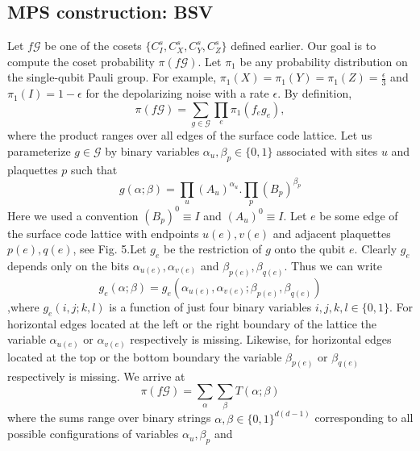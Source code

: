 \subsection{MPS construction: BSV}

Let \(f \mathcal{G}\) be one of the cosets \(\{C_{I}^{s}, C_{X}^{s}, C_{Y}^{s}, C_{Z}^{s}\}\) defined earlier. Our goal is to compute the coset probability \(\pi(f\mathcal{G})\). Let \(\pi_1\) be any  probability distribution on the single-qubit Pauli group. For example, \(\pi_1(X) = \pi_1(Y) = \pi_1(Z) = \frac{\epsilon}{3}\) and \(\pi_1(I) = 1 - \epsilon\) for the depolarizing noise with a rate \(\epsilon\). By definition,
\begin{equation*}
    \pi(f\mathcal{G}) = \sum_{g \in \mathcal{G}} \prod_{e} \pi_1 (f_e g_e),
\end{equation*}
where  the  product  ranges  over  all  edges  of  the  surface code lattice. Let us parameterize \(g \in \mathcal{G}\) by binary variables \(\alpha_u, \beta_p \in \{0,1\}\) associated with sites \(u\) and plaquettes \(p\) such that
\begin{equation*}
    g(\alpha ; \beta) = \prod_{u} (A_u)^{\alpha_u} . \prod_{p} (B_p)^{\beta_p}
\end{equation*}
Here we used a convention \((B_p)^0 \equiv I \) and \((A_u)^0 \equiv I \). Let \(e\) be some edge of the surface code lattice with endpoints \(u(e), v(e)\) and adjacent plaquettes \(p(e),q(e)\), see Fig. 5.Let \(g_e\) be the restriction of \(g\) onto the qubit \(e\). Clearly \(g_e\) depends only on the bits \( \alpha_{u(e)}, \alpha_{v(e)}\) and \( \beta_{p(e)}, \beta_{q(e)}\). Thus we can write
\begin{equation*}
    g_e(\alpha; \beta) = g_e( \alpha_{u(e)}, \alpha_{v(e)}; \beta_{p(e)}, \beta_{q(e)} )
\end{equation*}
,where \(g_e(i,j;k,l)\) is a function of just four binary variables \(i,j,k,l \in \{0,1\}\). For  horizontal  edges  located  at the left or the right boundary of the lattice the variable \(\alpha_{u(e)}\) or \(\alpha_{v(e)}\) respectively is missing. Likewise, for horizontal edges located at the top or the bottom boundary the variable \(\beta_{p(e)}\) or \(\beta_{q(e)}\) respectively is missing. We arrive at
\begin{equation*}
    \pi(f\mathcal{G}) = \sum_{\alpha} \sum_{\beta} T(\alpha; \beta)
\end{equation*}
where the sums range over binary strings \(\alpha, \beta \in \{0,1\}^{d(d-1)}\) corresponding to all possible configurations of variables \(\alpha_u, \beta_p\) and

